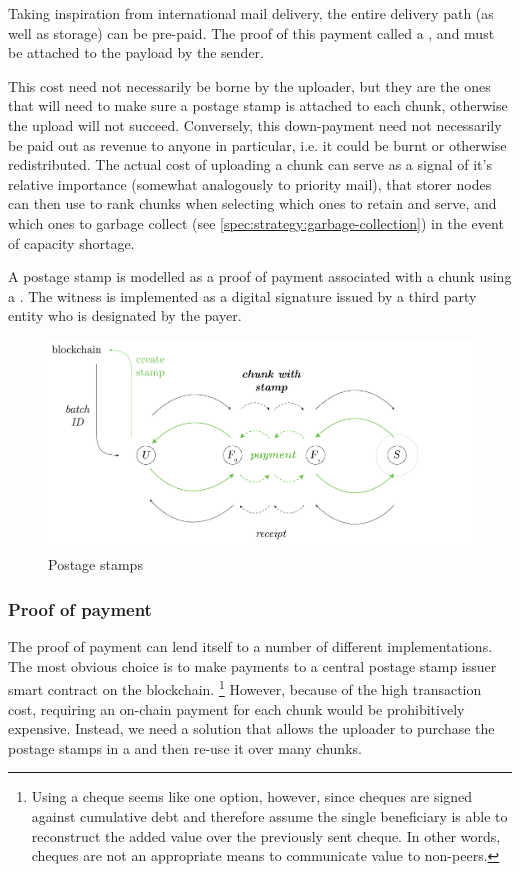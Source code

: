 Taking inspiration from international mail delivery, the entire delivery path (as well as storage) can be pre-paid. The proof of this payment called a , and must be attached to the payload by the sender.

This cost need not necessarily be borne by the uploader, but they are the ones that will need to make sure a postage stamp is attached to each chunk, otherwise the upload will not succeed. Conversely, this down-payment need not necessarily be paid out as revenue to anyone in particular, i.e. it could be burnt or otherwise redistributed. The actual cost of uploading a chunk can serve as a signal of it's relative importance (somewhat analogously to priority mail), that storer nodes can then use to rank chunks when selecting which ones to retain and serve, and which ones to garbage collect (see \ref{spec:strategy:garbage-collection}) in the event of capacity shortage.

A postage stamp is modelled as a proof of payment associated with a chunk using a . The witness is implemented as a digital signature issued by a third party entity who is designated by the payer.


\begin{figure}[htbp]
\centering
  \includegraphics[width=\textwidth]{fig/postage-stamp.pdf}
\caption[Postage stamps  \statusgreen]{Postage stamps}
\label{fig:postage-stamps}
\end{figure}

\subsubsection{Proof of payment}

The proof of payment can lend itself to a number of different implementations. The most obvious choice is to make payments to a central postage stamp issuer smart contract on the blockchain.%
%
\footnote{Using a cheque seems like one option, however, since cheques are signed against cumulative debt and therefore assume the single beneficiary is able to reconstruct the added value over the previously sent cheque. In other words, cheques are not an appropriate means to communicate value to non-peers.}
%
However, because of the high transaction cost, requiring an on-chain payment for each chunk would be prohibitively expensive. Instead, we need a solution that allows the uploader to purchase the postage stamps in a  and then re-use it over many chunks. 


